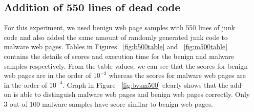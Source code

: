 \subsection{Addition of 550 lines of dead code}
For this experiment, we used benign web page samples with 550 lines of junk code and also added the same amount of randomly generated junk code to malware web pages. Tables in Figures ~\ref{fig:b500table} and  ~\ref{fig:m500table} contains the details of scores and execution time for the benign and malware samples respectively. From the table values, we can see that the scores for benign web pages are in the order of $10^{-3}$ whereas the scores for malware web pages are in the order of $10^{-4}$. Graph in Figure ~\ref{fig:bvsm500} clearly shows that the add-on is able to distinguish malware web pages and benign web pages correctly. Only 3 out of 100 malware samples have score similar to benign web pages.

